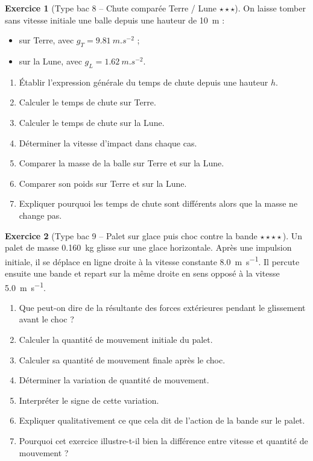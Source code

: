 \documentclass[11pt,a4paper]{article}
\theoremstyle{definition}
\newtheorem{exercice}{Exercice}[section]
\newcommand{\etoiles}[1]{\hfill{\small\textbf{#1}}}
\begin{document}
\begin{exercice}[Type bac 8 -- Chute comparée Terre / Lune \etoiles{$\star\star\star$}]
On laisse tomber sans vitesse initiale une balle depuis une hauteur de \SI{10}{m} :
\begin{itemize}
    \item sur Terre, avec $g_T=\SI{9,81}{m.s^{-2}}$ ;
    \item sur la Lune, avec $g_L=\SI{1,62}{m.s^{-2}}$.
\end{itemize}

\begin{enumerate}[label=\arabic*.]
    \item Établir l’expression générale du temps de chute depuis une hauteur $h$.
    \item Calculer le temps de chute sur Terre.
    \item Calculer le temps de chute sur la Lune.
    \item Déterminer la vitesse d’impact dans chaque cas.
    \item Comparer la masse de la balle sur Terre et sur la Lune.
    \item Comparer son poids sur Terre et sur la Lune.
    \item Expliquer pourquoi les temps de chute sont différents alors que la masse ne change pas.
\end{enumerate}
\end{exercice}

\begin{exercice}[Type bac 9 -- Palet sur glace puis choc contre la bande \etoiles{$\star\star\star\star$}]
Un palet de masse \SI{0,160}{kg} glisse sur une glace horizontale.
Après une impulsion initiale, il se déplace en ligne droite à la vitesse constante \SI{8,0}{m.s^{-1}}.
Il percute ensuite une bande et repart sur la même droite en sens opposé à la vitesse
\SI{5,0}{m.s^{-1}}.

\begin{enumerate}[label=\arabic*.]
    \item Que peut-on dire de la résultante des forces extérieures pendant le glissement avant le choc ?
    \item Calculer la quantité de mouvement initiale du palet.
    \item Calculer sa quantité de mouvement finale après le choc.
    \item Déterminer la variation de quantité de mouvement.
    \item Interpréter le signe de cette variation.
    \item Expliquer qualitativement ce que cela dit de l’action de la bande sur le palet.
    \item Pourquoi cet exercice illustre-t-il bien la différence entre vitesse et quantité de mouvement ?
\end{enumerate}
\end{exercice}
\end{document}
